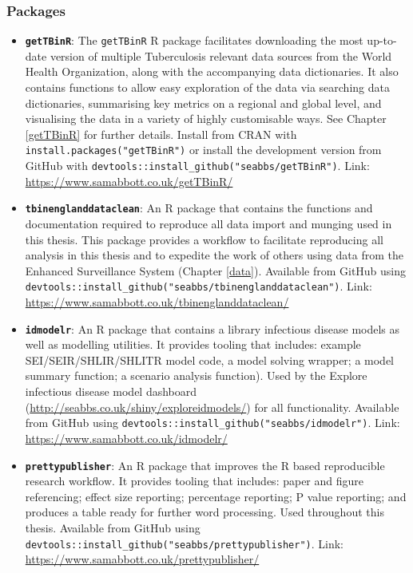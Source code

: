 \documentclass[11pt,twoside]{bristolthesis}
\begin{document}
  \hypertarget{packages}{%
  \subsubsection{Packages}\label{packages}}
  \begin{itemize}
  \item
    \textbf{\texttt{getTBinR}}: The \texttt{getTBinR} R package facilitates downloading the most up-to-date version of multiple Tuberculosis relevant data sources from the World Health Organization, along with the accompanying data dictionaries. It also contains functions to allow easy exploration of the data via searching data dictionaries, summarising key metrics on a regional and global level, and visualising the data in a variety of highly customisable ways. See Chapter \ref{getTBinR} for further details. Install from CRAN with \texttt{install.packages("getTBinR")} or install the development version from GitHub with \texttt{devtools::install\_github("seabbs/getTBinR")}. Link: \url{https://www.samabbott.co.uk/getTBinR/}
  \item
    \textbf{\texttt{tbinenglanddataclean}}: An R package that contains the functions and documentation required to reproduce all data import and munging used in this thesis. This package provides a workflow to facilitate reproducing all analysis in this thesis and to expedite the work of others using data from the Enhanced Surveillance System (Chapter \ref{data}). Available from GitHub using \texttt{devtools::install\_github("seabbs/tbinenglanddataclean")}. Link: \url{https://www.samabbott.co.uk/tbinenglanddataclean/}
  \item
    \textbf{\texttt{idmodelr}}: An R package that contains a library infectious disease models as well as modelling utilities. It provides tooling that includes: example SEI/SEIR/SHLIR/SHLITR model code, a model solving wrapper; a model summary function; a scenario analysis function). Used by the Explore infectious disease model dashboard (\url{http://seabbs.co.uk/shiny/exploreidmodels/}) for all functionality. Available from GitHub using \texttt{devtools::install\_github("seabbs/idmodelr")}. Link: \url{https://www.samabbott.co.uk/idmodelr/}
  \item
    \textbf{\texttt{prettypublisher}}: An R package that improves the R based reproducible research workflow. It provides tooling that includes: paper and figure referencing; effect size reporting; percentage reporting; P value reporting; and produces a table ready for further word processing. Used throughout this thesis. Available from GitHub using \texttt{devtools::install\_github("seabbs/prettypublisher")}. Link: \url{https://www.samabbott.co.uk/prettypublisher/}
  \end{itemize}
\end{document}

